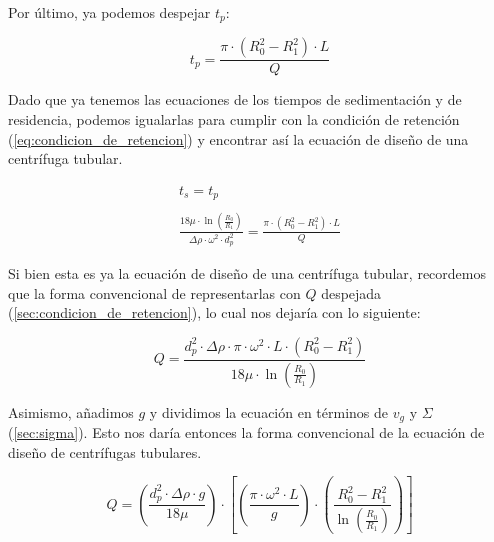 \documentclass{AsignaturaResumen}
\begin{document}
Por último, ya podemos despejar $t_{p}$:

\begin{equation}\label{eq:tiempo_de_permanencia_centrifuga_tubular}
    t_{p} = \frac{\pi \cdot (R_{0}^{2} - R_{1}^{2}) \cdot L}{Q}
\end{equation}

Dado que ya tenemos las ecuaciones de los tiempos de sedimentación y de residencia, podemos igualarlas para cumplir con la condición de retención (\autoref{eq:condicion_de_retencion}) y encontrar así la ecuación de diseño de una centrífuga tubular.

\begin{gather*}
    t_{s} = t_{p}
    \\\\
    \frac{18\mu\cdot\ln(\frac{R_{0}}{R_{1}})}{\Delta\rho\cdot\omega^{2}\cdot d_{p}^{2}} = \frac{\pi \cdot (R_{0}^{2} - R_{1}^{2}) \cdot L}{Q}
\end{gather*}

Si bien esta es ya la ecuación de diseño de una centrífuga tubular, recordemos que la forma convencional de representarlas con $Q$ despejada (\autoref{sec:condicion_de_retencion}), lo cual nos dejaría con lo siguiente:

\begin{equation*}
    Q = \frac{d_{p}^{2} \cdot \Delta\rho \cdot \pi \cdot \omega^{2} \cdot L \cdot (R_{0}^{2} - R_{1}^{2})}{18\mu \cdot \ln\left(\frac{R_{0}}{R_{1}}\right)}
\end{equation*}

Asimismo, añadimos $g$ y dividimos la ecuación en términos de $v_{g}$ y $\Sigma$ (\autoref{sec:sigma}). Esto nos daría entonces la forma convencional de la ecuación de diseño de centrífugas tubulares.

\begin{equation}\label{eq:diseño_de_centrifugas_tubulares}
    Q=\left(\frac{d_{p}^{2}\cdot\Delta\rho\cdot g}{18\mu}\right)\cdot\left[\left(\frac{\pi\cdot\omega^{2}\cdot L}{g}\right)\cdot\left(\frac{R_{0}^{2} - R_{1}^{2}}{\ln\left(\frac{R_{0}}{R_{1}}\right)}\right)\right]
\end{equation}
\end{document}
